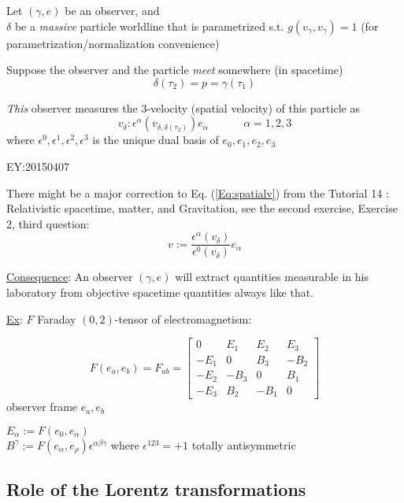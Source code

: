 \documentclass[10pt, twoside]{amsart}
\begin{document}
\begin{multicols*}{2}
\begin{enumerate}
Let $(\gamma, e)$ be an observer, and \\
$\delta$ be a \emph{massive} particle worldline that is parametrized s.t. $g(v_{\gamma}, v_{\gamma})=1$ (for parametrization/normalization convenience)

Suppose the observer and the particle \emph{meet} somewhere (in spacetime)
\[
\delta(\tau_2) = p = \gamma(\tau_1)
\]

\emph{This} observer measures the 3-velocity (spatial velocity) of this particle as 
\begin{equation}\label{Eq:spatialv}
v_{\delta}: \epsilon^{\alpha}( v_{\delta, \delta(\tau_2)} ) e_{\alpha} \quad \quad \quad \, \alpha =1,2,3
\end{equation}
where $\epsilon^0, \boxed{ \epsilon^1,\epsilon^2,\epsilon^3}$ is the unique dual basis of $e_0,\boxed{ e_1,e_2,e_3}$
\end{enumerate}

EY:20150407

There might be a major correction to Eq. (\ref{Eq:spatialv}) from the Tutorial 14 : Relativistic spacetime, matter, and Gravitation, see the second exercise, Exercise 2, third question:
\begin{equation}
v := \frac{ \epsilon^{\alpha}({v}_{\delta} ) }{ \epsilon^0({v}_{\delta}) } e_{\alpha}
\end{equation}

\underline{Consequence}:
An observer $(\gamma, e)$ will extract quantities measurable in his laboratory from objective spacetime quantities always like that.

\underline{Ex}: $F$ Faraday $(0,2)$-tensor of electromagnetism:

\[
F(e_a,e_b) = F_{ab} = \left[ \begin{matrix} 0 & E_1 & E_2 & E_3 \\ 
    -E_1 & 0 & B_3 & -B_2 \\ 
    -E_2 & -B_3 & 0 & B_1 \\
    -E_3 & B_2 & -B_1 & 0 \end{matrix} \right]
\]
observer frame $e_a,e_b$

$E_{\alpha} := F(e_0,e_{\alpha})$ \\
$B^{\gamma}:= F(e_{\alpha},e_{\rho})\epsilon^{\alpha \beta \gamma}$
where 
$\epsilon^{123} = +1$ totally antisymmetric

\subsection{Role of the Lorentz transformations}


\end{multicols*}
\end{document}
